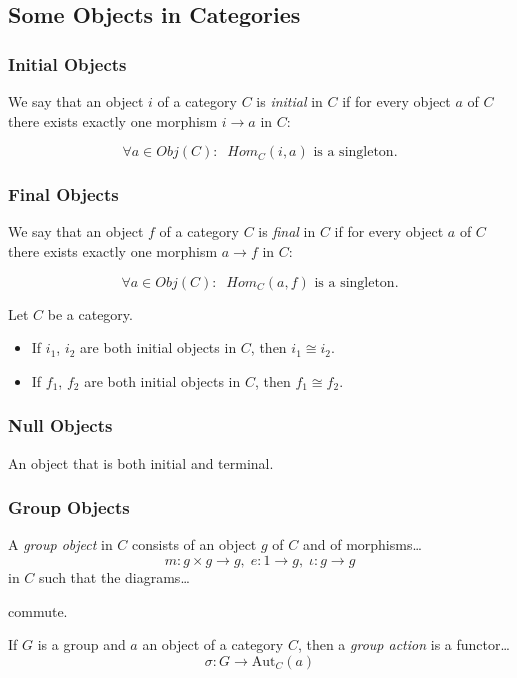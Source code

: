 \subsection{Some Objects in Categories}\label{someobjects}

\subsubsection{Initial Objects}\label{initial}

We say that an object $i$ of a category $C$ is \emph{initial} in $C$ if for every object $a$ of $C$ there exists exactly one morphism $i \rightarrow a$ in $C$:

$$\forall a \in Obj(C): \; \; Hom_C(i,a) \textrm{ is a singleton}.$$

\subsubsection{Final Objects}\label{final}

We say that an object $f$ of a category $C$ is \emph{final} in $C$ if for every object $a$ of $C$ there exists exactly one morphism $a \rightarrow f$ in $C$:

$$\forall a \in Obj(C): \; \; Hom_C(a,f) \textrm{ is a singleton}.$$

\begin{proposition}
Let $C$ be a category.
\begin{itemize}
  \item If $i_1$, $i_2$ are both initial objects in $C$, then $i_1 \cong i_2$.
  \item If $f_1$, $f_2$ are both initial objects in $C$, then $f_1 \cong f_2$.
\end{itemize}
\end{proposition}

\subsubsection{Null Objects}\label{null}

An object that is both initial and terminal.

\subsubsection{Group Objects}\label{groupobjects}

A \emph{group object} in $C$ consists of an object $g$ of $C$ and of morphisms\dots
$$m : g \times g \rightarrow g, \; e : 1 \rightarrow g, \; \iota : g \rightarrow g$$
in $C$ such that the diagrams\dots







commute.

\label{categoricalgroupactions}

If $G$ is a group and $a$ an object of a category $C$, then a \emph{group action} is a functor\dots
$$\sigma : G \rightarrow \textrm{Aut}_C(a)$$